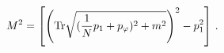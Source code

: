 \begin{equation}\label{2}
M^2=\left[\left({\rm Tr} \sqrt{({1\over
N}p_1+p_\varphi)^2+m^2}\right)^2-p_1^2\right]\,.
\end{equation}

